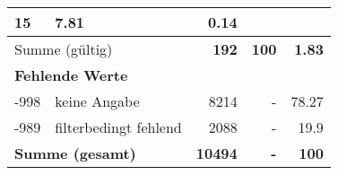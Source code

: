 \begin{longtable}{lXrrr}
       \num{15} &
       \num[round-mode=places,round-precision=2]{7,81} &
         \num[round-mode=places,round-precision=2]{0,14} \\
     \midrule
     \multicolumn{2}{l}{Summe (gültig)} &
       \textbf{\num{192}} &
     \textbf{100} &
       \textbf{\num[round-mode=places,round-precision=2]{1,83}} \\
     \multicolumn{5}{l}{\textbf{Fehlende Werte}}\\
       -998 &
       keine Angabe &
         \num{8214} &
        - &
         \num[round-mode=places,round-precision=2]{78,27} \\
       -989 &
       filterbedingt fehlend &
         \num{2088} &
        - &
         \num[round-mode=places,round-precision=2]{19,9} \\
     \midrule
     \multicolumn{2}{l}{\textbf{Summe (gesamt)}} &
          \textbf{\num{10494}} &
        \textbf{-} &
        \textbf{100} \\
     \bottomrule
     \end{longtable}
     
